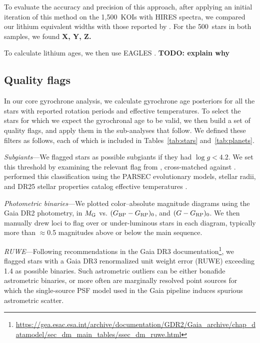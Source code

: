 \documentclass[11pt,twocolumn,tighten]{aastex63}
\newcommand{\nkoiswithhires}{{1{,}500}}
\newcommand{\nbergeroverlap}{{500}}
\begin{document}
To evaluate the accuracy and precision of this approach, after
applying an initial iteration of this method on the \nkoiswithhires\
KOIs with HIRES spectra, we compared our lithium equivalent widths
with those reported by \citet{Berger_2018}.
For the \nbergeroverlap\ stars in both samples, 
we found {\bf X, Y, Z.}

To calculate lithium ages, we then use EAGLES \citep{Jeffries_2023}.
{\bf TODO: explain why}



\subsection{Quality flags}
In our core gyrochrone analysis, we calculate gyrochrone age
posteriors for all the stars with reported rotation periods and
effective temperatures.  To select the stars for which we expect the
gyrochronal age to be valid, we then build a set of quality flags, and
apply them in the sub-analyses that follow.  We defined these filters
as follows, each of which is included in Tables~\ref{tab:stars}
and~\ref{tab:planets}.

{\it Subgiants}---We flagged stars as possible subgiants if they had
$\log g < 4.2$.  We set this threshold by examining the
relevant flag from \citet{berger_2018_radii_evolnstates},
cross-matched against \citet{Berger_2020a_catalog}.
\citet{berger_2018_radii_evolnstates} performed this classification
using the PARSEC evolutionary models, stellar radii, and DR25 stellar
properties catalog effective temperatures \citep{Mathur_2017}.

{\it Photometric binaries}---We plotted color--absolute magnitude
diagrams using the Gaia DR2 photometry, in $M_{\rm G}$ vs. $(G_{\rm
BP} - G_{\rm RP})_0$, and $(G - G_{\rm RP})_0$.  We then manually drew
loci to flag over or under-luminous stars in each diagram, typically
more than $\approx$0.5 magnitudes above or below the main sequence.

{\it RUWE}---Following recommendations in the Gaia DR3
documentation\footnote{\url{https://gea.esac.esa.int/archive/documentation/GDR2/Gaia_archive/chap_datamodel/sec_dm_main_tables/ssec_dm_ruwe.html}},
we flagged stars with a Gaia DR3 renormalized unit weight error (RUWE)
exceeding 1.4 as possible binaries.  Such astrometric outliers can be
either bonafide astrometric binaries, or more often are marginally
resolved point sources for which the single-source PSF model used in
the Gaia pipeline induces spurious astrometric scatter.
\end{document}
